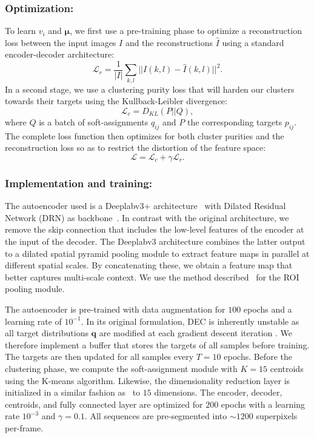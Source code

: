 \subsubsection{Optimization: }{ 
To learn $v_i$ and $\bm{\mu}$, we first use a pre-training phase to optimize a reconstruction loss between the input images $I$ and the reconstructions $\hat{I}$ using a standard encoder-decoder architecture:
\begin{equation}
\mathcal{L}_r = \frac{1}{|I|}\sum_{k,l} ||I(k,l) - \hat{I}(k,l)||^2.
\label{eq:loss_recons}
\end{equation}
\noindent
In a second stage, we use a clustering purity loss that will harden our clusters towards their targets using the Kullback-Leibler divergence:
\begin{equation}
\mathcal{L}_c = D_{KL}(P||Q),
\label{eq:loss_sim}
\end{equation}
\noindent
where $Q$ is a batch of soft-assignments $q_{ij}$ and $P$ the corresponding targets $p_{ij}$.
The complete loss function then optimizes for both cluster purities and the reconstruction loss so as to restrict the distortion of the feature space:
\begin{equation}
\mathcal{L} = \mathcal{L}_c + \gamma \mathcal{L}_r.
\label{eq:loss}
\end{equation}

\subsubsection{Implementation and training: }{ 
  The autoencoder used is a Deeplabv3+ architecture~\cite{chen17} with Dilated Residual Network (DRN) as backbone~\cite{yu17}. 
In contrast with the original architecture, we remove the skip connection that includes the low-level features of the encoder at the input of the decoder. The Deeplabv3 architecture combines the latter output to a dilated spatial pyramid pooling module to extract feature maps in parallel at different spatial scales. By concatenating these, we obtain a feature map that better captures multi-scale context. We use the method described~\cite{schuurmans18} for the ROI pooling module.
  
The autoencoder is pre-trained with data augmentation for $100$ epochs and a learning rate of $10^{-1}$.
In its original formulation, DEC is inherently unstable as all target distributions $\bm{q}$ are modified at each gradient descent iteration \cite{guo17}.
We therefore implement a buffer that stores the targets of all samples before training.
The targets are then updated for all samples every $T=10$ epochs.
Before the clustering phase, we compute the soft-assignment module with $K=15$ centroids using the K-means algorithm.
Likewise, the dimensionality reduction layer is initialized in a similar fashion as~\cite{lejeune18} to $15$ dimensions.
The encoder, decoder, centroids, and fully connected layer are optimized for $200$ epochs with a learning rate $10^{-3}$ and $\gamma=0.1$.
All sequences are pre-segmented into $\sim 1200$ superpixels per-frame.
}

}
